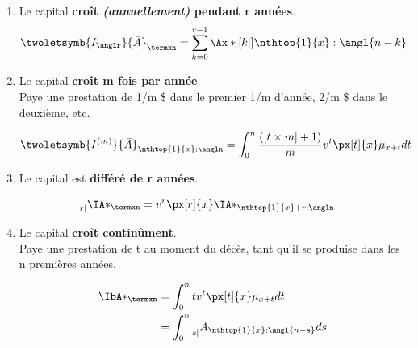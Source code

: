 \documentclass[10pt, french]{article}
\begin{document}
\begin{multicols*}{3}

\begin{enumerate}

	\item[] Le capital \textbf{croît \textit{(annuellement)} pendant r années}.\\
\begin{align*}
	\twoletsymb{I_{\anglr}}{\bar{A}}_{\termxn} 
		&= \sum_{k = 0}^{r - 1} \Ax*[k|]{\nthtop{1}{x}:\angl{n-k}} 
\end{align*}

	\item[] Le capital \textbf{croît m fois par année}.\\
	Paye une prestation de 1/m \$ dans le premier 1/m d'année, 2/m \$ dans le deuxième, etc.

\begin{align*}
	\twoletsymb{I^{(m)}}{\bar{A}}_{\nthtop{1}{x}:\angln} 
	&= \int_0^n \frac{([t \times m] + 1)}{m} v^t \px[t]{x} \mu_{x+t} dt 
\end{align*}


	\item[] Le capital est \textbf{différé de r années}.

\begin{align*}
	\prescript{}{r|}{\IA*_{\termxn}} 
	&= v^{r}\px[r]{x}\IA*_{\nthtop{1}{x} + r:\angln}
\end{align*}

	\item[] Le capital \textbf{croît continûment}.\\
	Paye une prestation de t au moment du décès, tant qu'il se produise dans les n premières années.

\begin{align*}
	\IbA*_{\termxn} 
	&=  \int_0^n t v^t \px[t]{x} \mu_{x+t} dt \\
	&= 	\int_0^n \prescript{}{s|}{\bar{A}_{\nthtop{1}{x}:\angl{n-s}}} ds
\end{align*}

\end{enumerate}


\end{multicols*}
\end{document}

